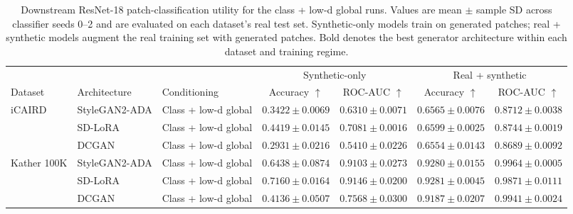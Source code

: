 \begin{table}[htbp]
\centering
\scriptsize
\setlength{\tabcolsep}{3.5pt}
\begin{tabular}{lllcccc}
\toprule
& & & \multicolumn{2}{c}{Synthetic-only} & \multicolumn{2}{c}{Real + synthetic} \\
\cmidrule(lr){4-5}\cmidrule(lr){6-7}
Dataset & Architecture & Conditioning & Accuracy $\uparrow$ & ROC-AUC $\uparrow$ & Accuracy $\uparrow$ & ROC-AUC $\uparrow$ \\
\midrule
\multirow{3}{*}{iCAIRD} & StyleGAN2-ADA & Class + low-d global & $0.3422 \pm 0.0069$ & $0.6310 \pm 0.0071$ & $0.6565 \pm 0.0076$ & $0.8712 \pm 0.0038$ \\
 & SD-LoRA & Class + low-d global & $\mathbf{0.4419 \pm 0.0145}$ & $\mathbf{0.7081 \pm 0.0016}$ & $\mathbf{0.6599 \pm 0.0025}$ & $\mathbf{0.8744 \pm 0.0019}$ \\
 & DCGAN & Class + low-d global & $0.2931 \pm 0.0216$ & $0.5410 \pm 0.0226$ & $0.6554 \pm 0.0143$ & $0.8689 \pm 0.0092$ \\
\midrule
\multirow{3}{*}{Kather 100K} & StyleGAN2-ADA & Class + low-d global & $0.6438 \pm 0.0874$ & $0.9103 \pm 0.0273$ & $0.9280 \pm 0.0155$ & $\mathbf{0.9964 \pm 0.0005}$ \\
 & SD-LoRA & Class + low-d global & $\mathbf{0.7160 \pm 0.0164}$ & $\mathbf{0.9146 \pm 0.0200}$ & $\mathbf{0.9281 \pm 0.0045}$ & $0.9871 \pm 0.0111$ \\
 & DCGAN & Class + low-d global & $0.4136 \pm 0.0507$ & $0.7568 \pm 0.0300$ & $0.9187 \pm 0.0207$ & $0.9941 \pm 0.0024$ \\
\bottomrule
\end{tabular}
\caption{Downstream ResNet-18 patch-classification utility for the class + low-d global runs. Values are mean $\pm$ sample SD across classifier seeds 0--2 and are evaluated on each dataset's real test set. Synthetic-only models train on generated patches; real + synthetic models augment the real training set with generated patches. Bold denotes the best generator architecture within each dataset and training regime.}
\label{tab:low-d-global-utility}
\end{table}
